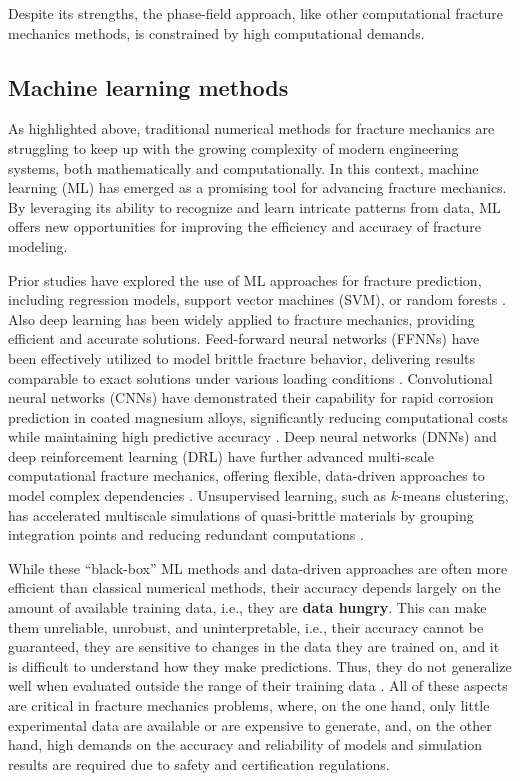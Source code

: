 \documentclass[final,3p,times]{elsarticle}
\begin{document}
Despite its strengths, the phase-field approach, like other computational fracture mechanics methods, is constrained by high computational demands.

\subsection{Machine learning methods}
As highlighted above, traditional numerical methods for fracture mechanics are struggling to keep up with the growing complexity of modern engineering systems, both mathematically and computationally. In this context, machine learning (ML) has emerged as a promising tool for advancing fracture mechanics. By leveraging its ability to recognize and learn intricate patterns from data, ML offers new opportunities for improving the efficiency and accuracy of fracture modeling.


Prior studies have explored the use of ML approaches for fracture prediction, including regression models, support vector machines (SVM), or random forests \cite{samaniego2020energy,aykol2021perspective,zhan2021machine,feng2021machine,liu2020machine,muller2021machine,zhan2021data}. Also deep learning has been widely applied to fracture mechanics, providing efficient and accurate solutions. Feed-forward neural networks (FFNNs) have been effectively utilized to model brittle fracture behavior, delivering results comparable to exact solutions under various loading conditions \cite{aldakheel2021feed}. Convolutional neural networks (CNNs) have demonstrated their capability for rapid corrosion prediction in coated magnesium alloys, significantly reducing computational costs while maintaining high predictive accuracy \cite{ma2025rapid}. Deep neural networks (DNNs) and deep reinforcement learning (DRL) have further advanced multi-scale computational fracture mechanics, offering flexible, data-driven approaches to model complex dependencies \cite{heider2021multi,ChaabanEtAl2023_ML_LBM}. Unsupervised learning, such as $k$-means clustering, has accelerated multiscale simulations of quasi-brittle materials by grouping integration points and reducing redundant computations \cite{chaouch2024unsupervised}.

While these ``black-box'' ML methods and data-driven approaches are often more efficient than classical numerical methods, their accuracy depends largely on the amount of available training data, i.e., they are \textbf{data hungry}. 
This can make them unreliable, unrobust, and uninterpretable, i.e., their accuracy cannot be guaranteed, they are sensitive to changes in the data they are trained on, and it is difficult to understand how they make predictions. Thus, they do not generalize well when evaluated outside the range of their training data \cite{montans2023}. All of these aspects are critical in fracture mechanics problems, where, on the one hand, only little experimental data are available or are expensive to generate, and, on the other hand, high demands on the accuracy and reliability of models and simulation results are required due to safety and certification regulations.
\end{document}
